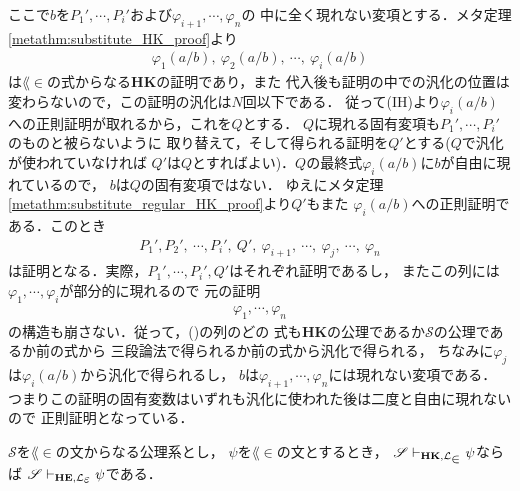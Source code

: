 \begin{metaprf}
\begin{description}
				ここで$b$を$P_{1}',\cdots,P_{i}'$および$\varphi_{i+1},\cdots,\varphi_{n}$の
				中に全く現れない変項とする．メタ定理\ref{metathm:substitute_HK_proof}より
				\begin{align}
					\varphi_{1}(a/b),\ \varphi_{2}(a/b),\ \cdots,\ \varphi_{i}(a/b)
				\end{align}
				は$\lang{\in}$の式からなる{\bf HK}の証明であり，また
				代入後も証明の中での汎化の位置は変わらないので，この証明の汎化は$N$回以下である．
				従って(IH)より$\varphi_{i}(a/b)$への正則証明が取れるから，これを$Q$とする．
				$Q$に現れる固有変項も$P_{1}',\cdots,P_{i}'$のものと被らないように
				取り替えて，そして得られる証明を$Q'$とする($Q$で汎化が使われていなければ
				$Q'$は$Q$とすればよい)．$Q$の最終式$\varphi_{i}(a/b)$に$b$が自由に現れているので，
				$b$は$Q$の固有変項ではない．
				ゆえにメタ定理\ref{metathm:substitute_regular_HK_proof}より$Q'$もまた
				$\varphi_{i}(a/b)$への正則証明である．このとき
				\begin{align}
					P_{1}',P_{2}',\ \cdots,P_{i}',\ Q',\ \varphi_{i+1},\ 
					\cdots,\ \varphi_{j},\ \cdots,\ \varphi_{n}
					\label{seq:regularization_of_HK_proof_1}
				\end{align}
				は証明となる．実際，$P_{1}',\cdots,P_{i}',Q'$はそれぞれ証明であるし，
				またこの列には$\varphi_{1},\cdots,\varphi_{i}$が部分的に現れるので
				元の証明
				\begin{align}
					\varphi_{1},\cdots,\varphi_{n}
				\end{align}
				の構造も崩さない．従って，()の列のどの
				式も{\bf HK}の公理であるか$\mathscr{S}$の公理であるか前の式から
				三段論法で得られるか前の式から汎化で得られる，
				ちなみに$\varphi_{j}$は$\varphi_{i}(a/b)$から汎化で得られるし，
				$b$は$\varphi_{i+1},\cdots,\varphi_{n}$には現れない変項である．
				つまりこの証明の固有変数はいずれも汎化に使われた後は二度と自由に現れないので
				正則証明となっている．
				\QED
		\end{description}
	\end{metaprf}
	
	\begin{screen}
		\begin{metathm}
		\label{metathm:theorems_in_HK_provable_in_HE}
			$\mathscr{S}$を$\lang{\in}$の文からなる公理系とし，
			$\psi$を$\lang{\in}$の文とするとき，
			$\mathscr{S} \provable{\mbox{{\bf HK}},\lang{\in}} \psi$ならば
			$\mathscr{S} \provable{\mbox{{\bf HE}},\lang{\varepsilon}} \psi$である．
		\end{metathm}
	\end{screen}
	

